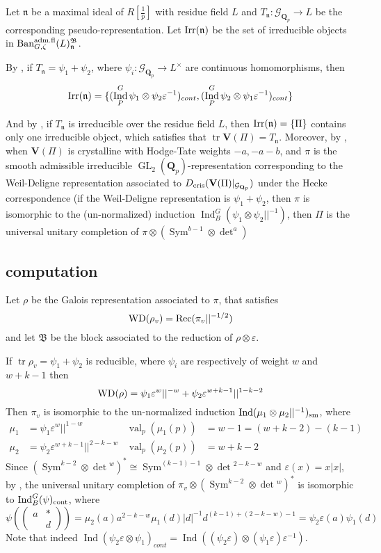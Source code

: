 \documentclass[leqno]{amsart}
\newcommand{\smat}[1]{\left( \begin{smallmatrix} #1 \end{smallmatrix} \right)}
\newcommand{\Gp}{\mathcal{G}_{\Qp}} %
\newcommand{\Ban}{\textnormal{Ban}^{\textnormal{adm.fl}}}
\newcommand{\Rec}{\textnormal{Rec}}
\newcommand{\Irr}{\textnormal{Irr}}
\newcommand{\WD}{\textnormal{WD}}
\newcommand{\cris}{\textnormal{cris}}
\newcommand{\cont}{\textnormal{cont}}
\newcommand{\sm}{\textnormal{sm}}
\DeclareMathOperator{\GL}{GL}
\DeclareMathOperator{\mtr}{tr}
\DeclareMathOperator{\Sym}{Sym}
\DeclareMathOperator{\val}{val}
\newcommand{\Qp}{\mathbf{Q}_p}
\newcommand{\1}{\mathbf{1}}
\newcommand{\B}{\mathfrak B}
\newcommand{\fn}{\mathfrak n}
\DeclareMathOperator{\Ind}{Ind}
\theoremstyle{definition}
\theoremstyle{remark}
\begin{document}
Let $\fn$ be a maximal ideal of  $R[\frac{1}{p}]$
with residue field  $L$ and 
$T_\fn\colon \Gp\to L$ 
be the corresponding pseudo-representation.
Let  $\Irr(\fn)$
be the set of irreducible objects in  $\Ban_{G,\zeta}(L)^\B_{\fn}$.

By \cite[Cor 8.15]{pask}, 
if $T_\fn=\psi_1+\psi_2$,
where  $\psi_i\colon \Gp\to L^\times$
are continuous homomorphisms, then  
\begin{equation}\label{eq:comple1}
	\Irr(\fn)=\{(\Ind_P^G\psi_1\otimes\psi_2\varepsilon^{-1})_{cont},
	(\Ind_P^G\psi_2\otimes\psi_1\varepsilon^{-1})_{cont}\}
\end{equation}

And by \cite[Cor 8.14]{pask}, 
if $T_\fn$ is irreducible over the residue field $L$, 
then $\Irr(\fn)=\{\Pi\}$ contains only one irreducible object,
which satisfies that $\mtr\mathbf{V}(\Pi)=T_\fn$.
Moreover, by \cite[Thm. 1.3]{CDP},
when $\mathbf{V}(\Pi)$ is crystalline with Hodge-Tate weights $-a,-a-b$,
and $\pi$ is the smooth admissible irreducible
$\GL_2(\Qp)$-representation
corresponding to the Weil-Deligne representation
associated to  $D_{\cris}(\mathbf{V}(\Pi)\vert_{\Gp})$
under the Hecke correspondence
(if the Weil-Deligne representation is $\psi_1+\psi_2$,
then $\pi$ is isomorphic to 
the (un-normalized) induction $\Ind_B^G(\psi_1\otimes\psi_2||^{-1})$,
then $\Pi$ is the universal unitary completion
of  $\pi\otimes(\Sym^{b-1}\otimes \det^a)$


\subsection{computation}

Let $\rho$ be the Galois representation
associated to  $\pi$, that satisfies
\[
	\WD(\rho_v)=\Rec(\pi_v||^{-1/2})
\]
and let $\B$ be the block associated to the reduction
of  $\rho\otimes\varepsilon$.

If $\mtr\rho_v=\psi_1+\psi_2$ is reducible,
where $\psi_i$ are respectively of weight
$w$ and  $w+k-1$
then 
\[
	\WD(\rho)=\psi_1\varepsilon^w||^{-w}+
	\psi_2\varepsilon^{w+k-1}||^{1-k-2}
\]
Then $\pi_v$ is isomorphic to the un-normalized induction
$\Ind(\mu_1\otimes\mu_2||^{-1})_{\sm}$, where
\begin{align*}
	\mu_1&=\psi_1\varepsilon^{w}||^{1-w} &
	\val_p(\mu_1(p))&=w-1=(w+k-2)-(k-1)\\
	\mu_2&=\psi_2\varepsilon^{w+k-1}||^{2-k-w} &
	\val_p(\mu_2(p))&=w+k-2
\end{align*}
Since $(\Sym^{k-2}\otimes\det{}^w)^*\cong \Sym^{(k-1)-1}\otimes\det{}^{2-k-w}$
and $\varepsilon(x)=x|x|$,
by \cite[Thm 12.3]{pask}, 
the universal unitary completion
of $\pi_v\otimes(\Sym^{k-2}\otimes\det{}^w)^*$
is isomorphic to $\Ind_B^G(\psi)_{\cont}$, where
\[
	\psi(\smat{a&*\\&d})=\mu_2(a)a^{2-k-w}\mu_1(d)|d|^{-1}d^{(k-1)+(2-k-w)-1}
	=\psi_2\varepsilon(a)\psi_1(d)
\]
Note that indeed 
$\Ind(\psi_2\varepsilon\otimes\psi_1)_{cont}=
\Ind((\psi_2\varepsilon)\otimes(\psi_1\varepsilon)\varepsilon^{-1})$.
\end{document}
